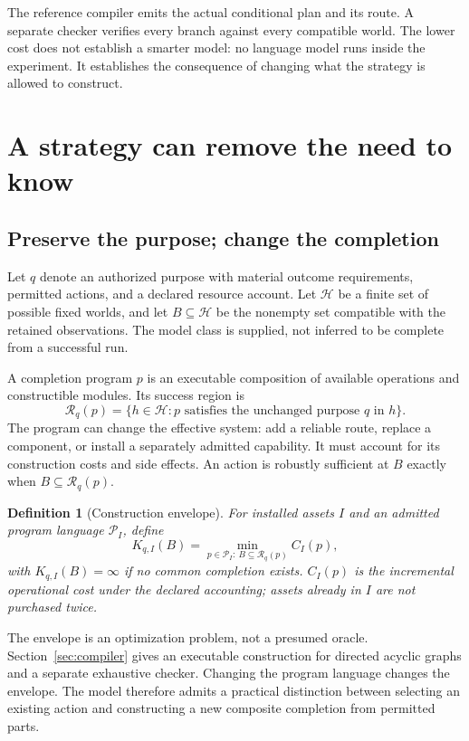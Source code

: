 \documentclass[11pt,letterpaper]{article}
\newcommand{\Hset}{\mathcal H}\newcommand{\Pset}{\mathcal P}\newcommand{\Tset}{\mathcal T}
\newcommand{\Req}{\mathcal R}\newcommand{\K}{\mathcal K}
\newtheorem{definition}{Definition}[section]
\theoremstyle{remark}\newtheorem{remark}{Remark}[section]
\begin{document}
The reference compiler emits the actual conditional plan and its route. A separate checker verifies every branch against every compatible world. The lower cost does not establish a smarter model: no language model runs inside the experiment. It establishes the consequence of changing what the strategy is allowed to construct.

\section{A strategy can remove the need to know}
\label{sec:semantics}
\subsection{Preserve the purpose; change the completion}
Let $q$ denote an authorized purpose with material outcome requirements, permitted actions, and a declared resource account. Let $\Hset$ be a finite set of possible fixed worlds, and let $B\subseteq\Hset$ be the nonempty set compatible with the retained observations. The model class is supplied, not inferred to be complete from a successful run.

A completion program $p$ is an executable composition of available operations and constructible modules. Its success region is
\begin{equation}
\Req_q(p)=\{h\in\Hset:p\text{ satisfies the unchanged purpose }q\text{ in }h\}.
\end{equation}
The program can change the effective system: add a reliable route, replace a component, or install a separately admitted capability. It must account for its construction costs and side effects. An action is robustly sufficient at $B$ exactly when $B\subseteq\Req_q(p)$.

\begin{definition}[Construction envelope]
For installed assets $I$ and an admitted program language $\Pset_I$, define
\begin{equation}\label{eq:envelope}
K_{q,I}(B)=\min_{p\in\Pset_I:\ B\subseteq\Req_q(p)} C_I(p),
\end{equation}
with $K_{q,I}(B)=\infty$ if no common completion exists. $C_I(p)$ is the incremental operational cost under the declared accounting; assets already in $I$ are not purchased twice.
\end{definition}
The envelope is an optimization problem, not a presumed oracle. Section~\ref{sec:compiler} gives an executable construction for directed acyclic graphs and a separate exhaustive checker. Changing the program language changes the envelope. The model therefore admits a practical distinction between selecting an existing action and constructing a new composite completion from permitted parts.
\end{document}
